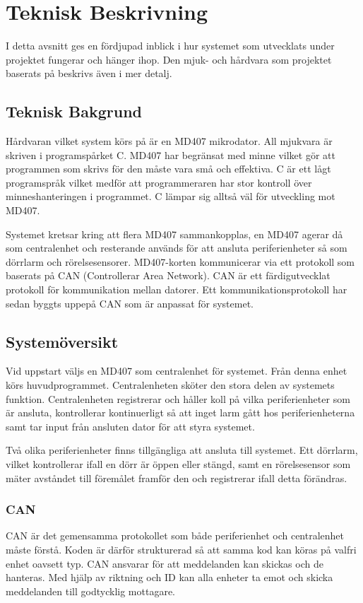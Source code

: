 \documentclass[a4paper]{article}
\begin{document}
\section{Teknisk Beskrivning}
I detta avsnitt ges en fördjupad inblick i hur systemet som utvecklats under projektet fungerar och hänger ihop.
Den mjuk- och hårdvara som projektet baserats på beskrivs även i mer detalj.

\subsection{Teknisk Bakgrund}
Hårdvaran vilket system körs på är en MD407 mikrodator.
All mjukvara är skriven i programspårket C.
MD407 har begränsat med minne vilket gör att programmen som skrivs för den måste vara små och effektiva.
C är ett lågt programspråk vilket medför att programmeraren har stor kontroll över minneshanteringen i programmet.
C lämpar sig alltså väl för utveckling mot MD407.

Systemet kretsar kring att flera MD407 sammankopplas, en MD407 agerar då som centralenhet och resterande används för att ansluta periferienheter så som dörrlarm och rörelsesensorer.
MD407-korten kommunicerar via ett protokoll som baserats på CAN (Controllerar Area Network).
CAN är ett färdigutvecklat protokoll för kommunikation mellan datorer.
Ett kommunikationsprotokoll har sedan byggts uppepå CAN som är anpassat för systemet.

\subsection{Systemöversikt}

Vid uppstart väljs en MD407 som centralenhet för systemet. Från denna enhet körs huvudprogrammet. Centralenheten sköter den stora delen av systemets funktion. Centralenheten registrerar och håller koll på vilka periferienheter som är ansluta, kontrollerar kontinuerligt så att inget larm gått hos periferienheterna samt tar input från ansluten dator för att styra systemet.

Två olika periferienheter finns tillgängliga att ansluta till systemet. Ett dörrlarm, vilket kontrollerar ifall en dörr är öppen eller stängd, samt en rörelsesensor som mäter avståndet till föremålet framför den och registrerar ifall detta förändras.

\subsubsection{CAN}
CAN är det gemensamma protokollet som både periferienhet och centralenhet måste förstå.
Koden är därför strukturerad så att samma kod kan köras på valfri enhet oavsett typ.
CAN ansvarar för att meddelanden kan skickas och de hanteras.
Med hjälp av riktning och ID kan alla enheter ta emot och skicka meddelanden till godtycklig mottagare.
\end{document}

